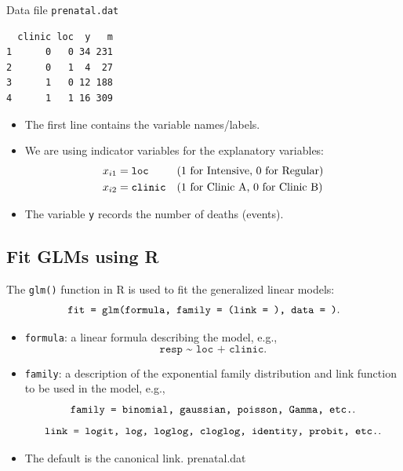 \documentclass{article}\usepackage[]{graphicx}\usepackage[svgnames]{xcolor}
\makeatletter
\newenvironment{kframe}{%
 \def\at@end@of@kframe{}%
 \ifinner\ifhmode%
  \def\at@end@of@kframe{\end{minipage}}%
  \begin{minipage}{\columnwidth}%
 \fi\fi%
 \def\FrameCommand##1{\hskip\@totalleftmargin \hskip-\fboxsep
 \colorbox{shadecolor}{##1}\hskip-\fboxsep
     \hskip-\linewidth \hskip-\@totalleftmargin \hskip\columnwidth}%
 \MakeFramed {\advance\hsize-\width
   \@totalleftmargin\z@ \linewidth\hsize
   \@setminipage}}%
 {\par\unskip\endMakeFramed%
 \at@end@of@kframe}
\newenvironment{knitrout}{}{} %
\makeatother
\begin{document}
\begin{Example}{Data file \texttt{prenatal.dat}}
\begin{knitrout}
\color{fgcolor}\begin{kframe}
\begin{verbatim}
  clinic loc  y   m
1      0   0 34 231
2      0   1  4  27
3      1   0 12 188
4      1   1 16 309
\end{verbatim}
\end{kframe}
\end{knitrout}
      \begin{itemize}
            \item The first line contains the variable names/labels.
            \item We are using indicator variables for the explanatory variables:
                  \begin{align*}
                        x_{i1} & =\text{\texttt{loc}}    &  & \text{(1 for Intensive, 0 for Regular)} \\
                        x_{i2} & =\text{\texttt{clinic}} &  & \text{(1 for Clinic A, 0 for Clinic B)}
                  \end{align*}
            \item The variable \texttt{y} records the number of deaths (events).
      \end{itemize}
\end{Example}
\subsection*{Fit GLMs using R}
The \texttt{glm()} function in R is used to fit the generalized linear models:
\[ \text{\texttt{fit = glm(formula, family = (link = ), data = )}}. \]
\begin{itemize}
      \item \texttt{formula}: a linear formula describing the model, e.g.,
            \[ \texttt{resp \textasciitilde{} loc + clinic}. \]
      \item \texttt{family}: a description of the exponential family distribution and link
            function to be used in the model, e.g.,
            \[ \text{\texttt{family = binomial, gaussian, poisson, Gamma, etc.}}. \]
            \[ \text{\texttt{link = logit, log, loglog, cloglog, identity, probit, etc.}}. \]
      \item The default is the canonical link. prenatal.dat
\end{itemize}
\end{document}
